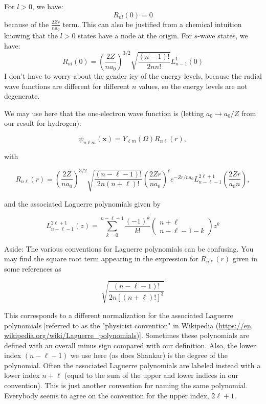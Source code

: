\documentclass[12pt]{article}
\begin{document}
\subsection{}
For $l > 0$, we have:
\begin{equation}
  R_{nl}(0) = 0
\end{equation}
because of the $\frac{2 Z r}{n a_{0}}$ term. This can also be justified from a chemical intuition knowing that the $l > 0$ states have a node at the origin. For $s$-wave states, we have:
\begin{equation}
  R_{nl}(0) = \left(\frac{2 Z}{n a_{0}}\right)^{3 / 2} \sqrt{\frac{(n-1) !}{2 nn !}} L_{n-1}^{1}\left(0\right)
\end{equation}
I don't have to worry about the gender icy of the energy levels, because the radial wave functions are different for different $n$ values, so the energy levels are not degenerate.


We may use here that the one-electron wave function is (letting $a_{0} \rightarrow a_{0} / Z$ from our result for hydrogen):

$$
\psi_{n \ell m}(\mathbf{x})=Y_{\ell m}(\Omega) R_{n \ell}(r),
$$

with

$$
R_{n \ell}(r)=\left(\frac{2 Z}{n a_{0}}\right)^{3 / 2} \sqrt{\frac{(n-\ell-1) !}{2 n(n+\ell) !}}\left(\frac{2 Z r}{n a_{0}}\right)^{\ell} e^{-Z r / n a_{0}} L_{n-\ell-1}^{2 \ell+1}\left(\frac{2 Z r}{a_{0} n}\right),
$$

and the associated Laguerre polynomials given by

$$
L_{n-\ell-1}^{2 \ell+1}(z)=\sum_{k=0}^{n-\ell-1} \frac{(-1)^{k}}{k !}\left(\begin{array}{c}
n+\ell \\
n-\ell-1-k
\end{array}\right) z^{k}
$$

Aside: The various conventions for Laguerre polynomials can be confusing. You may find the square root term appearing in the expression for $R_{n \ell}(r)$ given in some references as

$$
\sqrt{\frac{(n-\ell-1) !}{2 n[(n+\ell) !]^{3}}}
$$

This corresponds to a different normalization for the associated Laguerre polynomials [referred to as the "physicist convention" in Wikipedia (\href{https://en}{https://en}. \href{http://wikipedia.org/wiki/Laguerre_polynomials}{wikipedia.org/wiki/Laguerre\_polynomials})]. Sometimes these polynomials are defined with an overall minus sign compared with our definition. Also, the lower index $(n-\ell-1)$ we use here (as does Shankar) is the degree of the polynomial. Often the associated Laguerre polynomials are labeled instead with a lower index $n+\ell$ (equal to the sum of the upper and lower indices in our convention). This is just another convention for naming the same polynomial. Everybody seems to agree on the convention for the upper index, $2 \ell+1$.
\end{document}

